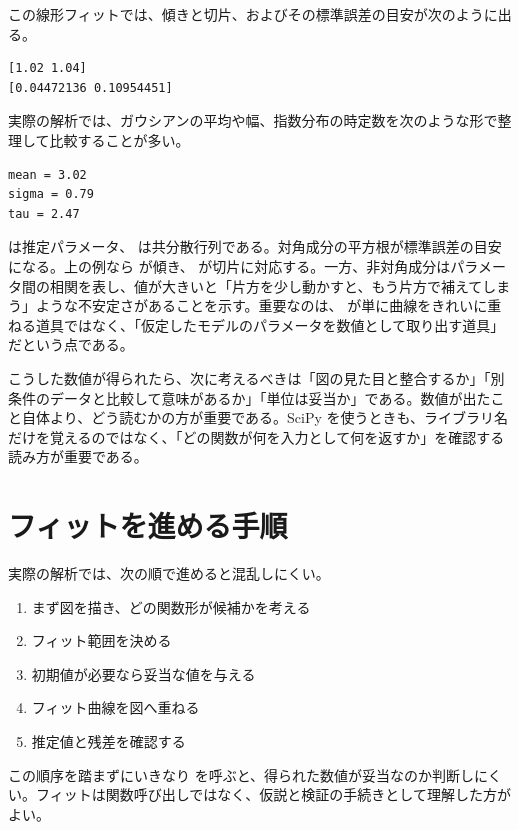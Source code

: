 この線形フィットでは、傾きと切片、およびその標準誤差の目安が次のように出る。

\begin{lstlisting}[numbers=none, xleftmargin=2\zw]
[1.02 1.04]
[0.04472136 0.10954451]
\end{lstlisting}

実際の解析では、ガウシアンの平均や幅、指数分布の時定数を次のような形で整理して比較することが多い。

\begin{lstlisting}[numbers=none, xleftmargin=2\zw]
mean = 3.02
sigma = 0.79
tau = 2.47
\end{lstlisting}

 は推定パラメータ、 は共分散行列である。対角成分の平方根が標準誤差の目安になる。上の例なら  が傾き、 が切片に対応する。一方、非対角成分はパラメータ間の相関を表し、値が大きいと「片方を少し動かすと、もう片方で補えてしまう」ような不安定さがあることを示す。重要なのは、 が単に曲線をきれいに重ねる道具ではなく、「仮定したモデルのパラメータを数値として取り出す道具」だという点である。

こうした数値が得られたら、次に考えるべきは「図の見た目と整合するか」「別条件のデータと比較して意味があるか」「単位は妥当か」である。数値が出たこと自体より、どう読むかの方が重要である。SciPy を使うときも、ライブラリ名だけを覚えるのではなく、「どの関数が何を入力として何を返すか」を確認する読み方が重要である。

\section{フィットを進める手順}

実際の解析では、次の順で進めると混乱しにくい。

\begin{enumerate}
\item まず図を描き、どの関数形が候補かを考える
\item フィット範囲を決める
\item 初期値が必要なら妥当な値を与える
\item フィット曲線を図へ重ねる
\item 推定値と残差を確認する
\end{enumerate}

この順序を踏まずにいきなり  を呼ぶと、得られた数値が妥当なのか判断しにくい。フィットは関数呼び出しではなく、仮説と検証の手続きとして理解した方がよい。

